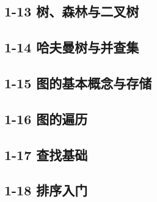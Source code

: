 \documentclass[10pt, aspectratio=169]{beamer}
\begin{document}
\subsection{1-13 树、森林与二叉树}


\subsection{1-14 哈夫曼树与并查集}


\subsection{1-15 图的基本概念与存储}


\subsection{1-16 图的遍历}


\subsection{1-17 查找基础}


\subsection{1-18 排序入门}

\end{document}
